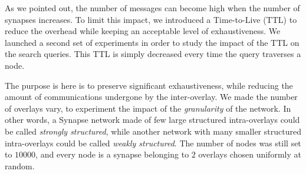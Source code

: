%


%
As we pointed out, the number of messages can become high when the
number of synapses increases. To limit this impact, we introduced a
Time-to-Live (TTL) to reduce the overhead while keeping an acceptable
level of exhaustiveness.  We launched a second set of experiments in
order to study the impact of the TTL on the search queries. This TTL
is simply decreased every time the query traverses a node. 

The purpose is here is to preserve significant exhaustiveness, while
reducing the amount of communications undergone by the
inter-overlay. We made the number of overlays vary, to experiment the
impact of the \emph{granularity} of the network.  In other words, a
Synapse network made of few large structured intra-overlays could be
called \emph{strongly structured}, while another network with many
smaller structured intra-overlays could be called \emph{weakly
  structured}. The number of nodes was still set to $10000$, and every
node is a synapse belonging to $2$ overlays chosen uniformly at
random.


